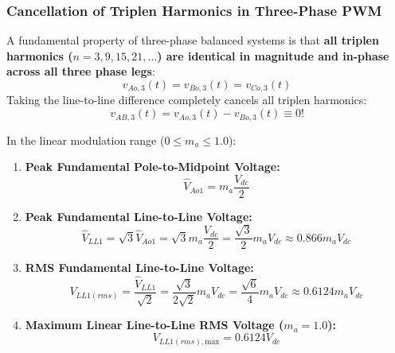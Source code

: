 \documentclass[11pt,a4paper]{article}
\begin{document}
\subsubsection{Cancellation of Triplen Harmonics in Three-Phase PWM}
A fundamental property of three-phase balanced systems is that \textbf{all triplen harmonics ($n = 3, 9, 15, 21, \dots$) are identical in magnitude and in-phase across all three phase legs}:
\begin{equation}
v_{Ao,3}(t) = v_{Bo,3}(t) = v_{Co,3}(t)
\end{equation}
Taking the line-to-line difference completely cancels all triplen harmonics:
\begin{equation}
v_{AB,3}(t) = v_{Ao,3}(t) - v_{Bo,3}(t) \equiv 0!
\end{equation}
\begin{conceptbox}
In the linear modulation range ($0 \le m_a \le 1.0$):
\begin{enumerate}
  \item \textbf{Peak Fundamental Pole-to-Midpoint Voltage:}
  \begin{equation}
  \hat{V}_{Ao1} = m_a \frac{V_{dc}}{2}
  \end{equation}
  \item \textbf{Peak Fundamental Line-to-Line Voltage:}
  \begin{equation}
  \hat{V}_{LL1} = \sqrt{3} \hat{V}_{Ao1} = \sqrt{3} m_a \frac{V_{dc}}{2} = \frac{\sqrt{3}}{2} m_a V_{dc} \approx 0.866 m_a V_{dc}
  \label{eq:vll1_peak}
  \end{equation}
  \item \textbf{RMS Fundamental Line-to-Line Voltage:}
  \begin{equation}
  V_{LL1(rms)} = \frac{\hat{V}_{LL1}}{\sqrt{2}} = \frac{\sqrt{3}}{2\sqrt{2}} m_a V_{dc} = \frac{\sqrt{6}}{4} m_a V_{dc} \approx 0.6124 m_a V_{dc}
  \label{eq:vll1_rms}
  \end{equation}
  \item \textbf{Maximum Linear Line-to-Line RMS Voltage ($m_a = 1.0$):}
  \begin{equation}
  V_{LL1(rms),\text{max}} = 0.6124 V_{dc}
  \end{equation}
\end{enumerate}
\end{conceptbox}
\end{document}
